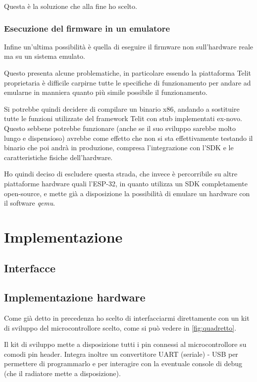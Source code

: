 \documentclass[12pt,a4paper,twoside,titlepage]{book}
\begin{document}
Questa è la soluzione che alla fine ho scelto.

\subsection{Esecuzione del firmware in un emulatore}

Infine un'ultima possibilità è quella di eseguire il firmware non sull'hardware
reale ma su un sistema emulato.

Questo presenta alcune problematiche, in particolare essendo la piattaforma Telit
proprietaria è difficile carpirne tutte le specifiche di funzionamento per andare
ad emularne in manniera quanto più simile possibile il funzionamento.

Si potrebbe quindi decidere di compilare un binario x86, andando a sostituire tutte
le funzioni utilizzate del framework Telit con stub implementati ex-novo. Questo
sebbene potrebbe funzionare (anche se il suo sviluppo sarebbe molto lungo e dispensioso)
avrebbe come effetto che non si sta effettivamente testando il binario che poi andrà
in produzione, compresa l'integrazione con l'SDK e le caratteristiche fisiche dell'hardware.

Ho quindi deciso di escludere questa strada, che invece è percorribile su altre
piattaforme hardware quali l'ESP-32, in quanto utilizza un SDK completamente open-source,
e mette già a disposizione la possibilità di emulare un hardware con il software \textit{qemu}.

\chapter{Implementazione}

\section{Interfacce}

\section{Implementazione hardware}

Come già detto in precedenza ho scelto di interfacciarmi direttamente con un kit
di sviluppo del microcontrollore scelto, come si può vedere in \autoref{fig:quadretto}.

Il kit di sviluppo mette a disposizione tutti i pin connessi al microcontrollore
su comodi pin header. Integra inoltre un convertitore UART (seriale) - USB per
permettere di programmarlo e per interagire con la eventuale console di debug
(che il radiatore mette a disposizione).
\end{document}
